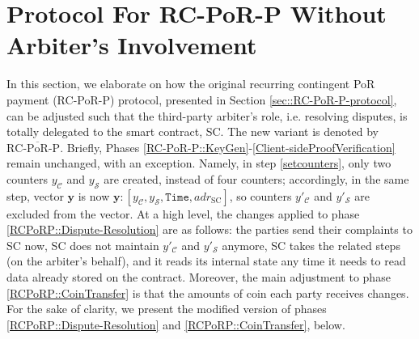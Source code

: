
\section{Protocol For RC-PoR-P Without Arbiter's Involvement}\label{sec::R-PoR-P-protocol-Withohut-Arbiter}

In this section, we elaborate on how the original recurring contingent PoR payment (RC-PoR-P) protocol, presented in Section \ref{sec::RC-PoR-P-protocol}, can be adjusted such that the third-party arbiter's role, i.e. resolving disputes, is totally delegated to the smart contract, SC.  The new variant is denoted by  ${\text{RC-}\overline{\text{PoR}}\text{-P}}$. Briefly, Phases \ref{RC-PoR-P::KeyGen}-\ref{Client-sideProofVerification} remain  unchanged, with an exception. Namely,   in step \ref{setcounters}, only two counters $y_{\scriptscriptstyle\mathcal{C}}$ and $y_{\scriptscriptstyle\mathcal{S}}$ are created, instead of four counters; accordingly, in the same step,  vector $\bm{y}$ is now   $\bm{y}: [y_{\scriptscriptstyle\mathcal C},y_{\scriptscriptstyle\mathcal S},  \texttt{Time},adr_{\scriptscriptstyle \text{SC}}]$, so counters $y'_{\scriptscriptstyle\mathcal{C}}$ and $y'_{\scriptscriptstyle\mathcal{S}}$  are excluded from the vector. At a high level,  the changes applied to phase \ref{RCPoRP::Dispute-Resolution} are as follows:  the parties send their complaints to SC now, SC does not maintain $y'_{\scriptscriptstyle\mathcal{C}}$ and $y'_{\scriptscriptstyle\mathcal{S}}$ anymore, SC takes the related steps  (on the arbiter's behalf), and it reads its internal state any time it needs to read data already stored on the contract. Moreover, the main adjustment to phase  \ref{RCPoRP::CoinTransfer} is that the amounts of coin each party receives  changes. For the sake of clarity, we  present  the modified version of  phases \ref{RCPoRP::Dispute-Resolution} and \ref{RCPoRP::CoinTransfer}, below. 




